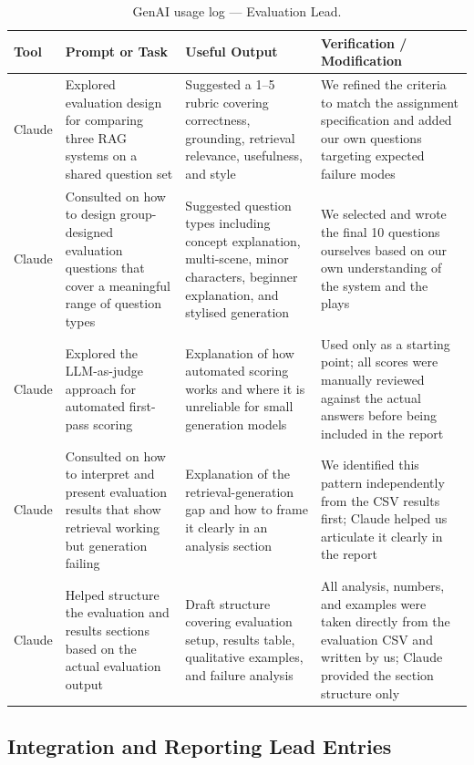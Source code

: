 \documentclass[10pt,conference]{IEEEtran}
\begin{document}
\begin{table}[h]
\centering
\caption{GenAI usage log --- Evaluation Lead.}
\label{tab:genai-log-varshu}
\begin{tabularx}{\textwidth}{p{1.5cm} p{3.5cm} p{3.5cm} X}
\toprule
Tool & Prompt or Task & Useful Output & Verification / Modification \\
\midrule
Claude & Explored evaluation design for comparing three RAG systems
on a shared question set & Suggested a 1--5 rubric covering
correctness, grounding, retrieval relevance, usefulness, and style
& We refined the criteria to match the assignment specification
and added our own questions targeting expected failure modes \\
Claude & Consulted on how to design group-designed evaluation
questions that cover a meaningful range of question types &
Suggested question types including concept explanation,
multi-scene, minor characters, beginner explanation, and stylised
generation & We selected and wrote the final 10 questions
ourselves based on our own understanding of the system and the
plays \\
Claude & Explored the LLM-as-judge approach for automated
first-pass scoring & Explanation of how automated scoring works
and where it is unreliable for small generation models & Used only
as a starting point; all scores were manually reviewed against the
actual answers before being included in the report \\
Claude & Consulted on how to interpret and present evaluation
results that show retrieval working but generation failing &
Explanation of the retrieval-generation gap and how to frame it
clearly in an analysis section & We identified this pattern
independently from the CSV results first; Claude helped us
articulate it clearly in the report \\
Claude & Helped structure the evaluation and results sections
based on the actual evaluation output & Draft structure covering
evaluation setup, results table, qualitative examples, and failure
analysis & All analysis, numbers, and examples were taken directly
from the evaluation CSV and written by us; Claude provided the
section structure only \\
\bottomrule
\end{tabularx}
\end{table}

\subsection*{Integration and Reporting Lead Entries}
\end{document}
